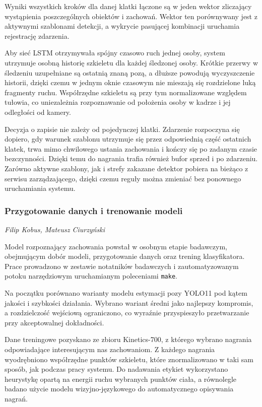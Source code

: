 Wyniki wszystkich kroków dla danej klatki łączone są w jeden wektor zliczający wystąpienia poszczególnych obiektów i zachowań. Wektor ten porównywany jest z aktywnymi szablonami detekcji, a wykrycie pasującej kombinacji uruchamia rejestrację zdarzenia.

Aby sieć LSTM otrzymywała spójny czasowo ruch jednej osoby, system utrzymuje osobną historię szkieletu dla każdej śledzonej osoby. Krótkie przerwy w śledzeniu uzupełniane są ostatnią znaną pozą, a dłuższe powodują wyczyszczenie historii, dzięki czemu w jednym oknie czasowym nie mieszają się rozdzielone luką fragmenty ruchu. Współrzędne szkieletu są przy tym normalizowane względem tułowia, co uniezależnia rozpoznawanie od położenia osoby w kadrze i jej odległości od kamery.

Decyzja o zapisie nie zależy od pojedynczej klatki. Zdarzenie rozpoczyna się dopiero, gdy warunek szablonu utrzymuje się przez odpowiednią część ostatnich klatek, trwa mimo chwilowego ustania zachowania i kończy się po zadanym czasie bezczynności. Dzięki temu do nagrania trafia również bufor sprzed i po zdarzeniu. Zarówno aktywne szablony, jak i strefy zakazane detektor pobiera na bieżąco z serwisu zarządzającego, dzięki czemu reguły można zmieniać bez ponownego uruchamiania systemu.

\subsubsection{Przygotowanie danych i trenowanie modeli}
\small \textit{Filip Kobus, Mateusz Ciurzyński}

Model rozpoznający zachowania powstał w osobnym etapie badawczym, obejmującym dobór modeli, przygotowanie danych oraz trening klasyfikatora. Prace prowadzono w zestawie notatników badawczych i zautomatyzowanym potoku narzędziowym uruchamianym poleceniami \texttt{make}.

Na początku porównano warianty modelu estymacji pozy YOLO11 pod kątem jakości i szybkości działania. Wybrano wariant średni jako najlepszy kompromis, a rozdzielczość wejściową ograniczono, co wyraźnie przyspieszyło przetwarzanie przy akceptowalnej dokładności.

Dane treningowe pozyskano ze zbioru Kinetics-700, z którego wybrano nagrania odpowiadające interesującym nas zachowaniom. Z każdego nagrania wyodrębniono współrzędne punktów szkieletu, które znormalizowano w taki sam sposób, jak podczas pracy systemu. Do nadawania etykiet wykorzystano heurystykę opartą na energii ruchu wybranych punktów ciała, a równolegle badano użycie modelu wizyjno-językowego do automatycznego opisywania nagrań.

